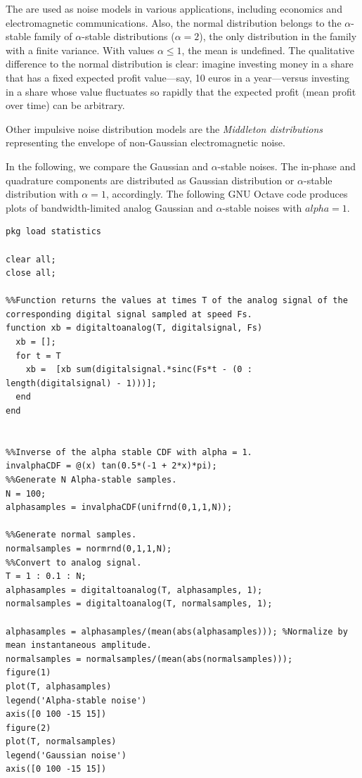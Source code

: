 \documentclass{article}
\begin{document}
The  are used as noise models in various applications, including economics and electromagnetic communications. Also, the normal distribution belongs to the $\alpha$-stable family of $\alpha$-stable distributions ($\alpha = 2$), the only distribution in the family with a finite variance. With values $\alpha \leq 1$, the mean is undefined. The qualitative difference to the normal distribution is clear: imagine investing money in a share that has a fixed expected profit value---say, 10 euros in a year---versus investing in a share whose value fluctuates so rapidly that the expected profit (mean profit over time) can be arbitrary.

Other impulsive noise distribution models are the \textit{Middleton distributions} representing the envelope of non-Gaussian electromagnetic noise.

In the following, we compare the Gaussian and $\alpha$-stable noises. The in-phase and quadrature components are distributed as Gaussian distribution or $\alpha$-stable distribution with $\alpha =1$, accordingly. The following GNU Octave code produces plots of bandwidth-limited analog Gaussian and  $\alpha$-stable noises with $alpha = 1$. 

\begin{verbatim}
pkg load statistics

clear all;
close all;

%%Function returns the values at times T of the analog signal of the corresponding digital signal sampled at speed Fs.
function xb = digitaltoanalog(T, digitalsignal, Fs)
  xb = [];
  for t = T
    xb =  [xb sum(digitalsignal.*sinc(Fs*t - (0 : length(digitalsignal) - 1)))];
  end
end


%%Inverse of the alpha stable CDF with alpha = 1.
invalphaCDF = @(x) tan(0.5*(-1 + 2*x)*pi);
%%Generate N Alpha-stable samples.
N = 100;
alphasamples = invalphaCDF(unifrnd(0,1,1,N));

%%Generate normal samples.
normalsamples = normrnd(0,1,1,N);
%%Convert to analog signal.
T = 1 : 0.1 : N;
alphasamples = digitaltoanalog(T, alphasamples, 1);
normalsamples = digitaltoanalog(T, normalsamples, 1);

alphasamples = alphasamples/(mean(abs(alphasamples))); %Normalize by mean instantaneous amplitude.
normalsamples = normalsamples/(mean(abs(normalsamples)));
figure(1)
plot(T, alphasamples)
legend('Alpha-stable noise')
axis([0 100 -15 15])
figure(2)
plot(T, normalsamples)
legend('Gaussian noise')
axis([0 100 -15 15])


\end{verbatim}
\end{document}
